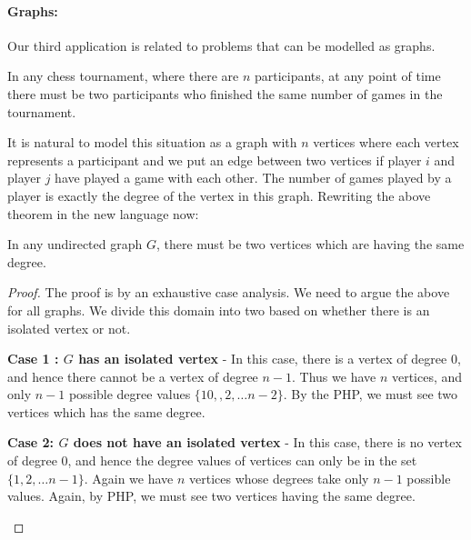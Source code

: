 \paragraph{Graphs:}

Our third application is related to problems that can be modelled as graphs.

\begin{theorem}
In any chess tournament, where there are $n$ participants, at any point of time there must be two participants who finished the same number of games in the tournament.
\end{theorem}
It is natural to model this situation as a graph with $n$ vertices where each vertex represents a participant and we put an edge between two vertices if player $i$  and player $j$ have played a game with each other. The number of games played by a player is exactly the degree of the vertex in this graph. Rewriting the above theorem in the new language now:
\begin{theorem}
In any undirected graph $G$, there must be two vertices which are having the same degree.
\end{theorem}
\begin{proof}
The proof is by an exhaustive case analysis. We need to argue the above for all graphs. We divide this domain into two based on whether there is an isolated vertex or not.
\begin{description}
\item{\bf Case 1 : $G$ has an isolated vertex} - In this case, there is a vertex of degree $0$, and hence there cannot be a vertex of degree $n-1$. Thus we have $n$ vertices, and only $n-1$ possible degree values $\{10,,2,\ldots n-2\}$. By the PHP, we must see two vertices which has the same degree.
\item{\bf Case 2: $G$ does not have an isolated vertex} - In this case, there is no vertex of degree $0$, and hence the degree values of vertices can only be in the set $\{1, 2, \ldots n-1\}$. Again we have $n$ vertices whose degrees take only $n-1$ possible values. Again, by PHP, we must see two vertices having the same degree.
\end{description}
\end{proof}

